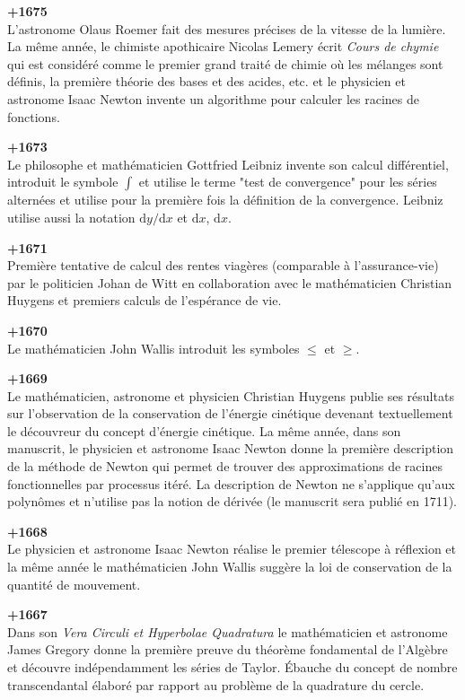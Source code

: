 \textbf{+1675}\\
L'astronome Olaus Roemer fait des mesures précises de la vitesse de la lumière. La même année, le chimiste apothicaire Nicolas Lemery écrit \textit{Cours de chymie} qui est considéré comme le premier grand traité de chimie où les mélanges sont définis, la première théorie des bases et des acides, etc. et le physicien et astronome Isaac Newton invente un algorithme pour calculer les racines de fonctions.

\textbf{+1673}\\
Le philosophe et mathématicien Gottfried Leibniz invente son calcul différentiel, introduit le symbole $\int $ et utilise le terme "test de convergence" pour les séries alternées et utilise pour la première fois la définition de la convergence. Leibniz utilise aussi la notation $\mathrm{d}y / \mathrm{d}x$ et $\mathrm{d}x$, $\mathrm{d}x$.

\textbf{+1671}\\
Première tentative de calcul des rentes viagères (comparable à l'assurance-vie) par le politicien Johan de Witt en collaboration avec le mathématicien Christian Huygens et premiers calculs de l'espérance de vie.

\textbf{+1670}\\
Le mathématicien John Wallis introduit les symboles $\le$ et $\ge$.

\textbf{+1669}\\
Le mathématicien, astronome et physicien Christian Huygens publie ses résultats sur l'observation de la conservation de l'énergie cinétique devenant textuellement le découvreur du concept d'énergie cinétique. La même année, dans son manuscrit, le physicien et astronome Isaac Newton donne la première description de la méthode de Newton qui permet de trouver des approximations de racines fonctionnelles par processus itéré. La description de Newton ne s'applique qu'aux polynômes et n'utilise pas la notion de dérivée (le manuscrit sera publié en 1711).

\textbf{+1668}\\
Le physicien et astronome Isaac Newton réalise le premier télescope à réflexion et la même année le mathématicien John Wallis suggère la loi de conservation de la quantité de mouvement.

\textbf{+1667}\\
Dans son \textit{Vera Circuli et Hyperbolae Quadratura} le mathématicien et astronome James Gregory donne la première preuve du théorème fondamental de l'Algèbre et découvre indépendamment les séries de Taylor. Ébauche du concept de nombre transcendantal élaboré par rapport au problème de la quadrature du cercle.

